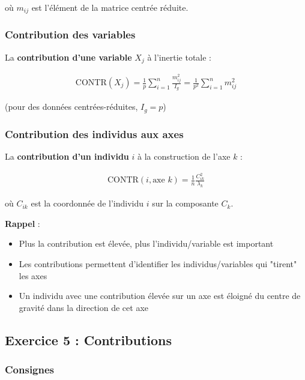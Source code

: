 \documentclass[11pt,a4paper]{article}
\begin{document}
où $m_{ij}$ est l'élément de la matrice centrée réduite.

\subsubsection{Contribution des variables}

La \textbf{contribution d'une variable} $X_j$ à l'inertie totale :

\begin{align*}
\text{CONTR}(X_j) = \frac{1}{p}\sum_{i=1}^{n} \frac{m_{ij}^2}{I_g} = \frac{1}{p^2}\sum_{i=1}^{n} m_{ij}^2
\end{align*}

(pour des données centrées-réduites, $I_g = p$)

\subsubsection{Contribution des individus aux axes}

La \textbf{contribution d'un individu} $i$ à la construction de l'axe $k$ :

\begin{align*}
\text{CONTR}(i, \text{axe } k) = \frac{1}{n}\frac{C_{ik}^2}{\lambda_k}
\end{align*}

où $C_{ik}$ est la coordonnée de l'individu $i$ sur la composante $C_k$.

\begin{rappelbox}
\textbf{Rappel} : 
\begin{itemize}
    \item Plus la contribution est élevée, plus l'individu/variable est important
    \item Les contributions permettent d'identifier les individus/variables qui "tirent" les axes
    \item Un individu avec une contribution élevée sur un axe est éloigné du centre de gravité dans la direction de cet axe
\end{itemize}
\end{rappelbox}

\newpage

\subsection{Exercice 5 : Contributions}

\subsubsection{Consignes}
\end{document}

